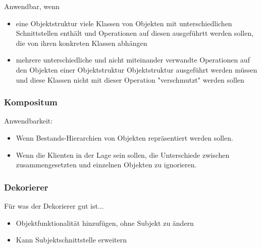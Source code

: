 

Anwendbar, wenn
\begin{itemize}
    \item eine Objektstruktur viele Klassen von Objekten mit unterschiedlichen Schnittstellen enthält und Operationen auf diesen ausgeführtt werden sollen, die von ihren konkreten Klassen abhängen
    \item mehrere unterschiedliche und nicht miteinander verwandte Operationen auf den Objekten einer Objektstruktur Objektstruktur ausgeführt werden müssen und diese Klassen nicht mit dieser Operation "verschmutzt" werden sollen
\end{itemize}

\subsubsection{Kompositum}



Anwendbarkeit:
\begin{itemize}
    \item Wenn Bestands-Hierarchien von Objekten repräsentiert werden sollen.
    \item Wenn die Klienten in der Lage sein sollen, die Unterschiede zwischen zusammengesetzten und einzelnen Objekten zu ignorieren.
\end{itemize}

\subsubsection{Dekorierer}


Für was der Dekorierer gut ist...
\begin{itemize}
    \item Objektfunktionalität hinzufügen, ohne Subjekt zu ändern
    \item Kann Subjektschnittstelle erweitern
\end{itemize}

